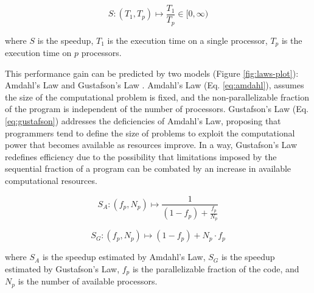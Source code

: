 \documentclass[Ingles]{phdthesis}
\begin{document}
\begin{equation}
  S \colon (T_1, T_p) \mapsto \frac{T_1}{T_p} \in [0,\infty)
  \label{eq:speedup}
\end{equation}

\noindent where \(S\) is the speedup, \(T_1\) is the execution time on a single processor, \(T_p\) is the execution time on \(p\) processors.

This performance gain can be predicted by two models (Figure \ref{fig:laws-plot}): Amdahl's Law \cite{amdahl1967} and Gustafson's Law \cite{gustafson1988}. Amdahl's Law (Eq. \ref{eq:amdahl}), assumes the size of the computational problem is fixed, and the non-parallelizable fraction of the program is independent of the number of processors. Gustafson's Law (Eq. \ref{eq:gustafson}) addresses the deficiencies of Amdahl's Law, proposing that programmers tend to define the size of problems to exploit the computational power that becomes available as resources improve. In a way, Gustafson's Law redefines efficiency due to the possibility that limitations imposed by the sequential fraction of a program can be combated by an increase in available computational resources.

\begin{equation}
  S_A \colon (f_p, N_p) \mapsto \frac{1}{(1 - f_p) + \frac{f_p}{N_p}}
  \label{eq:amdahl}
\end{equation}

\begin{equation}
  S_G \colon (f_p, N_p) \mapsto (1 - f_p) + N_p \cdot f_p
  \label{eq:gustafson}
\end{equation}

\noindent where \(S_A\) is the speedup estimated by Amdahl's Law, \(S_G\) is the speedup estimated by Gustafson's Law, \(f_p\) is the parallelizable fraction of the code, and \(N_p\) is the number of available processors.
\end{document}
